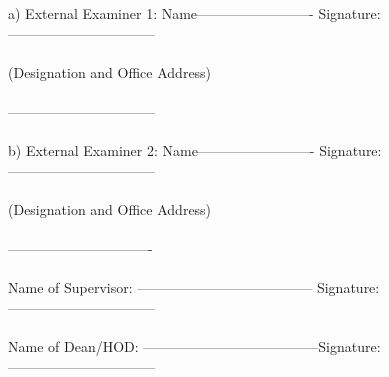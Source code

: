 \documentclass[a4paper,12pt,one side]{report}
\theoremstyle{definition}
\begin{document}
    a)  External Examiner 1: Name-------------------------	      
      Signature:-------------------------------- \\~\\			
	(Designation and Office Address)\\~\\
--------------------------------\\~\\
b)  External Examiner 2: Name-------------------------	Signature:-------------------------------- 	\\	~\\	
	(Designation and Office Address)\\~\\
-------------------------------\\~\\
Name of Supervisor: -------------------------------------- 	Signature:--------------------------------\\	~\\		
Name of Dean/HOD: --------------------------------------Signature:--------------------------------\\			
								
\end{document}
